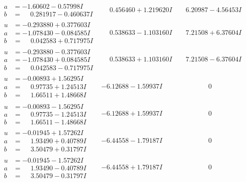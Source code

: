 \documentclass[1p]{elsarticle_modified}
\theoremstyle{definition}
\begin{document}
$$\begin{array}{c|c|c}
\begin{aligned}
a &= -1.60602 - 0.57998 I \\
b &= \phantom{-}0.281917 - 0.460637 I\end{aligned}
 & \phantom{-}0.456460 + 1.219620 I & \phantom{-}6.20987 - 4.56453 I \\ \hline\begin{aligned}
u &= -0.293880 + 0.377603 I \\
a &= -1.078430 - 0.084585 I \\
b &= \phantom{-}0.042583 + 0.717975 I\end{aligned}
 & \phantom{-}0.538633 - 1.103160 I & \phantom{-}7.21508 + 6.37604 I \\ \hline\begin{aligned}
u &= -0.293880 - 0.377603 I \\
a &= -1.078430 + 0.084585 I \\
b &= \phantom{-}0.042583 - 0.717975 I\end{aligned}
 & \phantom{-}0.538633 + 1.103160 I & \phantom{-}7.21508 - 6.37604 I \\ \hline\begin{aligned}
u &= -0.00893 + 1.56295 I \\
a &= \phantom{-}0.97735 + 1.24513 I \\
b &= \phantom{-}1.66511 + 1.48668 I\end{aligned}
 & -6.12688 - 1.59937 I & \phantom{-0.000000 } 0 \\ \hline\begin{aligned}
u &= -0.00893 - 1.56295 I \\
a &= \phantom{-}0.97735 - 1.24513 I \\
b &= \phantom{-}1.66511 - 1.48668 I\end{aligned}
 & -6.12688 + 1.59937 I & \phantom{-0.000000 } 0 \\ \hline\begin{aligned}
u &= -0.01945 + 1.57262 I \\
a &= \phantom{-}1.93490 + 0.40789 I \\
b &= \phantom{-}3.50479 + 0.31797 I\end{aligned}
 & -6.44558 - 1.79187 I & \phantom{-0.000000 } 0 \\ \hline\begin{aligned}
u &= -0.01945 - 1.57262 I \\
a &= \phantom{-}1.93490 - 0.40789 I \\
b &= \phantom{-}3.50479 - 0.31797 I\end{aligned}
 & -6.44558 + 1.79187 I & \phantom{-0.000000 } 0\\

\end{array}$$
\end{document}
